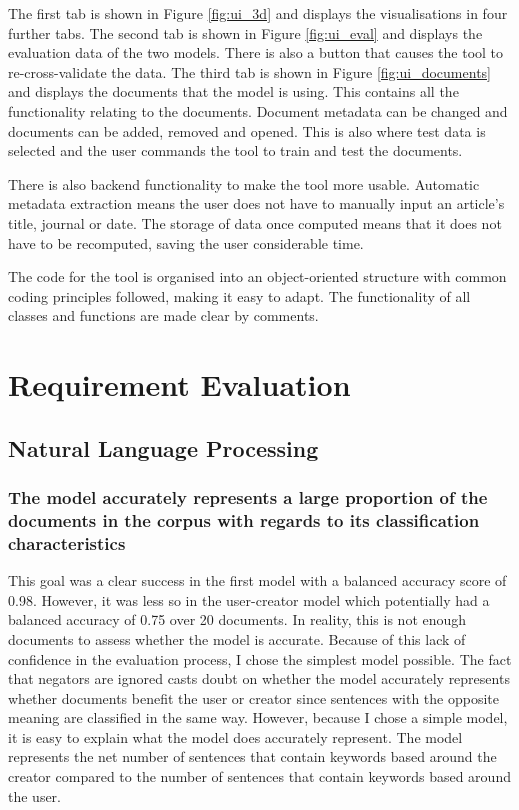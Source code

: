 			The first tab is shown in Figure \ref{fig:ui_3d} and displays the visualisations in four further tabs. The second tab is shown in Figure \ref{fig:ui_eval} and displays the evaluation data of the two models.  There is also a button that causes the tool to re-cross-validate the data. The third tab is shown in Figure \ref{fig:ui_documents} and displays the documents that the model is using. This contains all the functionality relating to the documents. Document metadata can be changed and documents can be added, removed and opened. This is also where test data is selected and the user commands the tool to train and test the documents. 

			There is also backend functionality to make the tool more usable. Automatic metadata extraction means the user does not have to manually input an article's title, journal or date. The storage of data once computed means that it does not have to be recomputed, saving the user considerable time. 

			The code for the tool is organised into an object-oriented structure with common coding principles followed, making it easy to adapt. The functionality of all classes and functions are made clear by comments.
	\section{Requirement Evaluation}
		\subsection{Natural Language Processing}
			\subsubsection{The model accurately represents a large proportion of the documents in the corpus with regards to its classification characteristics}
				This goal was a clear success in the first model with a balanced accuracy score of 0.98. However, it was less so in the user-creator model which potentially had a balanced accuracy of 0.75 over 20 documents. In reality, this is not enough documents to assess whether the model is accurate. Because of this lack of confidence in the evaluation process, I chose the simplest model possible. The fact that negators are ignored casts doubt on whether the model accurately represents whether documents benefit the user or creator since sentences with the opposite meaning are classified in the same way. However, because I chose a simple model, it is easy to explain what the model does accurately represent. The model represents the net number of sentences that contain keywords based around the creator compared to the number of sentences that contain keywords based around the user. 

